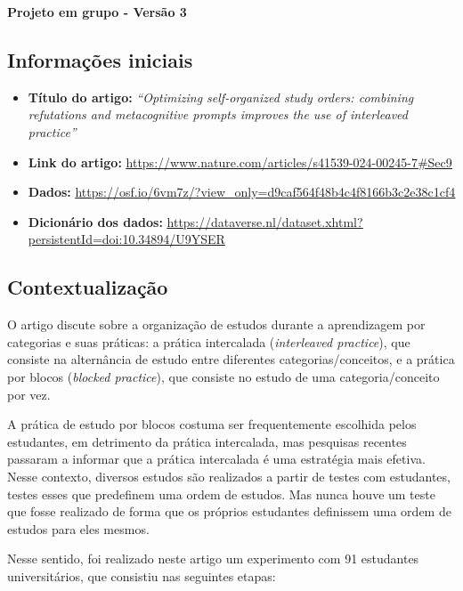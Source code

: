 \documentclass[
]{article}
\author{}
\date{\vspace{-2.5em}}
\begin{document}
\begin{center}
    {\LARGE \bfseries Projeto em grupo - Versão 3}
    
\end{center}

\subsection{Informações iniciais}\label{informauxe7uxf5es-iniciais}

\begin{itemize}
\item
  \textbf{Título do artigo:} \emph{``Optimizing self-organized study
  orders: combining refutations and metacognitive prompts improves the
  use of interleaved practice''}
\item
  \textbf{Link do artigo:}
  \textcolor{blue}{\underline{\url{https://www.nature.com/articles/s41539-024-00245-7\#Sec9}}}
\item
  \textbf{Dados:}
  \textcolor{blue}{\underline{\url{https://osf.io/6vm7z/?view_only=d9caf564f48b4c4f8166b3c2e38c1cf4}}}
\item
  \textbf{Dicionário dos dados:}
  \textcolor{blue}{\underline{\url{https://dataverse.nl/dataset.xhtml?persistentId=doi:10.34894/U9YSER}}}
\end{itemize}

\subsection{Contextualização}\label{contextualizauxe7uxe3o}

O artigo discute sobre a organização de estudos durante a aprendizagem
por categorias e suas práticas: a prática intercalada (\emph{interleaved
practice}), que consiste na alternância de estudo entre diferentes
categorias/conceitos, e a prática por blocos (\emph{blocked practice}),
que consiste no estudo de uma categoria/conceito por vez.

A prática de estudo por blocos costuma ser frequentemente escolhida
pelos estudantes, em detrimento da prática intercalada, mas pesquisas
recentes passaram a informar que a prática intercalada é uma estratégia
mais efetiva. Nesse contexto, diversos estudos são realizados a partir
de testes com estudantes, testes esses que predefinem uma ordem de
estudos. Mas nunca houve um teste que fosse realizado de forma que os
próprios estudantes definissem uma ordem de estudos para eles mesmos.

Nesse sentido, foi realizado neste artigo um experimento com 91
estudantes universitários, que consistiu nas seguintes etapas:
\end{document}
